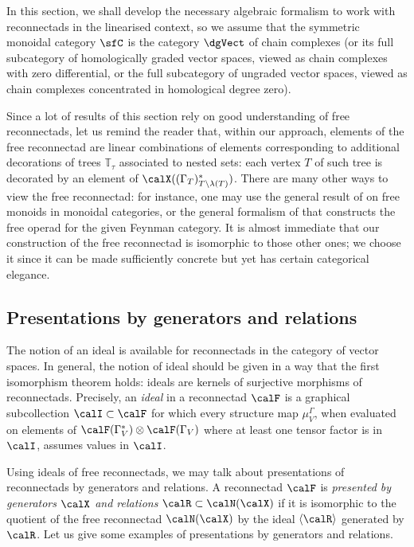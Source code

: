 In this section, we shall develop the necessary algebraic formalism to work with reconnectads in the linearised context, so we assume that the symmetric monoidal category $\sfC$ is the category $\dgVect$ of chain complexes (or its full subcategory of homologically graded vector spaces, viewed as chain complexes with zero differential, or the full subcategory of ungraded vector spaces, viewed as chain complexes concentrated in homological degree zero).  

Since a lot of results of this section rely on good understanding of free reconnectads, let us remind the reader that, within our approach, elements of the free reconnectad are linear combinations of elements corresponding to additional decorations of trees $\mathbb{T}_\tau$ associated to nested sets: each vertex $T$ of such tree is decorated by an element of $\calX((\Gamma_T)^*_{T\setminus\lambda(T)})$. There are many other ways to view the free reconnectad: for instance, one may use the general result of \cite{MR2471247} on free monoids in monoidal categories, or the general formalism of \cite{MR3636409} that constructs the free operad for the given Feynman category. It is almost immediate that our construction of the free reconnectad is isomorphic to those other ones; we choose it since it can be made sufficiently concrete but yet has certain categorical elegance. 

\subsection{Presentations by generators and relations}

The notion of an ideal is available for reconnectads in the category of vector spaces. In general, the notion of ideal should be given in a way that the first isomorphism theorem holds: ideals are kernels of surjective morphisms of reconnectads. Precisely, an \emph{ideal} in a reconnectad $\calF$ is a graphical subcollection $\calI\subset\calF$ for which every structure map $\mu_V^\Gamma$, when evaluated on elements of $\calF(\Gamma^*_V)\otimes\calF(\Gamma_V)$ where at least one tensor factor is in $\calI$, assumes values in $\calI$.

Using ideals of free reconnectads, we may talk about presentations of reconnectads by generators and relations.  A reconnectad $\calF$ is \emph{presented by generators $\calX$ and relations $\calR\subset\calN(\calX)$} if it is isomorphic to the quotient of the free reconnectad $\calN(\calX)$ by the ideal $\langle\calR\rangle$ generated by $\calR$. Let us give some examples of presentations by generators and relations. 

